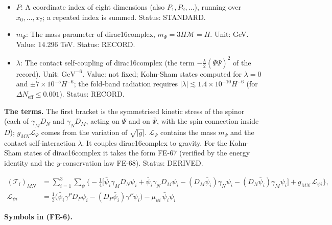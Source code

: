 \documentclass[
  10pt,
]{article}
\begin{document}
\begin{itemize}
\item
  \(P\): A coordinate index of eight dimensions (also
  \(P_1, P_2, \dots\)), running over \(x_0, \dots, x_7\); a repeated
  index is summed. Status: STANDARD.
\item
  \(m_\Psi\): The mass parameter of dirac16complex,
  \(m_\Psi = 3H\mathcal{M} = H\). Unit: GeV. Value: 14.296 TeV. Status:
  RECORD.
\item
  \(\lambda\): The contact self-coupling of dirac16complex (the term
  \(-\frac{\lambda}{2}(\bar\Psi\Psi)^2\) of the record). Unit:
  \(\mathrm{GeV}^{-6}\). Value: not fixed; Kohn-Sham states computed for
  \(\lambda = 0\) and \(\pm7\times10^{-5}H^{-6}\); the fold-band
  radiation requires
  \(\lvert\lambda\rvert \lesssim 1.4\times10^{-10}H^{-6}\) (for
  \(\Delta N_{\mathrm{eff}} \le 0.001\)). Status: RECORD.
\end{itemize}

\textbf{The terms.} The first bracket is the symmetrised kinetic stress
of the spinor (each of \(\gamma_M D_N\) and \(\gamma_N D_M\), acting on
\(\Psi\) and on \(\bar\Psi\), with the spin connection inside \(D\));
\(g_{MN}\mathcal{L}_\Psi\) comes from the variation of
\(\sqrt{\lvert g\rvert}\). \(\mathcal{L}_\Psi\) contains the mass
\(m_\Psi\) and the contact self-interaction \(\lambda\). It couples
dirac16complex to gravity. For the Kohn-Sham states of dirac16complex it
takes the form FE-67 (verified by the energy identity and the
\(y\)-conservation law FE-68). Status: DERIVED.

\[
\begin{aligned}
(\mathcal{T}_{\mathrm{f}})_{MN} &= \sum_{i=1}^{3}\sum_\psi\Big\{-\frac14\Big[\bar\psi_i\gamma_MD_N\psi_i
 + \bar\psi_i\gamma_ND_M\psi_i - (D_M\bar\psi_i)\gamma_N\psi_i - (D_N\bar\psi_i)\gamma_M\psi_i\Big]
 + g_{MN}\,\mathcal{L}_{\psi i}\Big\},\\
\mathcal{L}_{\psi i} &= \tfrac12\big(\bar\psi_i\gamma^PD_P\psi_i - (D_P\bar\psi_i)\gamma^P\psi_i\big)
 - \mu_{\psi i}\,\bar\psi_i\psi_i
\end{aligned} \tag{FE-6}
\]

\textbf{Symbols in (FE-6).}
\end{document}
